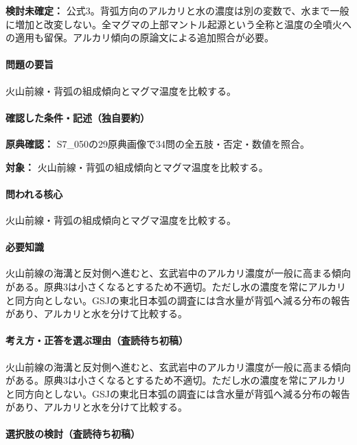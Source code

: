 \par\textbf{検討未確定：} 公式3。背弧方向のアルカリと水の濃度は別の変数で、水まで一般に増加と改変しない。全マグマの上部マントル起源という全称と温度の全噴火への適用も留保。アルカリ傾向の原論文による追加照合が必要。

\paragraph{問題の要旨} 火山前線・背弧の組成傾向とマグマ温度を比較する。

\paragraph{確認した条件・記述（独自要約）}\mbox{}\par

\noindent\textbf{原典確認：} S7\_050の29原典画像で34問の全五肢・否定・数値を照合。\par

\noindent\textbf{対象：} 火山前線・背弧の組成傾向とマグマ温度を比較する。\par

\paragraph{問われる核心} 火山前線・背弧の組成傾向とマグマ温度を比較する。

\paragraph{必要知識} 火山前線の海溝と反対側へ進むと、玄武岩中のアルカリ濃度が一般に高まる傾向がある。原典3は小さくなるとするため不適切。ただし水の濃度を常にアルカリと同方向としない。GSJの東北日本弧の調査には含水量が背弧へ減る分布の報告があり、アルカリと水を分けて比較する。

\paragraph{考え方・正答を選ぶ理由（査読待ち初稿）} 火山前線の海溝と反対側へ進むと、玄武岩中のアルカリ濃度が一般に高まる傾向がある。原典3は小さくなるとするため不適切。ただし水の濃度を常にアルカリと同方向としない。GSJの東北日本弧の調査には含水量が背弧へ減る分布の報告があり、アルカリと水を分けて比較する。

\paragraph{選択肢の検討（査読待ち初稿）}\mbox{}\par

